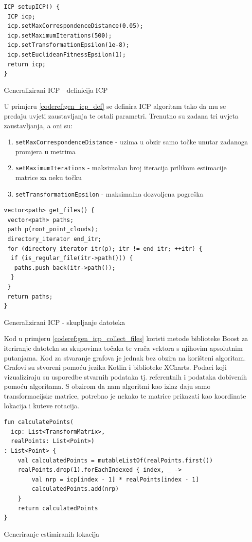 \begin{listing}[h!]
  \begin{verbatim}
ICP setupICP() {
 ICP icp;
 icp.setMaxCorrespondenceDistance(0.05);
 icp.setMaximumIterations(500);
 icp.setTransformationEpsilon(1e-8);
 icp.setEuclideanFitnessEpsilon(1);
 return icp;
}
  \end{verbatim}
  \caption{Generalizirani ICP - definicija ICP}
  \label{coderef:gen_icp_def}
\end{listing}
\pagebreak
U primjeru \ref{coderef:gen_icp_def} se definira ICP algoritam tako da mu se predaju uvjeti zaustavljanja te ostali parametri. Trenutno su zadana tri uvjeta zaustavljanja, a oni su:

\begin{enumerate}
  \item \texttt{setMaxCorrespondenceDistance} - uzima u obzir samo točke unutar zadanoga promjera u metrima
  \item \texttt{setMaximumIterations} - maksimalan broj iteracija prilikom estimacije matrice za neku točku
  \item \texttt{setTransformationEpsilon} - maksimalna dozvoljena pogreška
\end{enumerate}

\begin{listing}[h!]
  \begin{verbatim}
vector<path> get_files() {
 vector<path> paths;
 path p(root_point_clouds);
 directory_iterator end_itr;
 for (directory_iterator itr(p); itr != end_itr; ++itr) {
  if (is_regular_file(itr->path())) {
   paths.push_back(itr->path());
  }
 }
 return paths;
}
  \end{verbatim}
  \caption{Generalizirani ICP - skupljanje datoteka}
  \label{coderef:gen_icp_collect_files}
\end{listing}
\pagebreak
Kod u primjeru \ref{coderef:gen_icp_collect_files} koristi metode biblioteke Boost za iteriranje datoteka sa skupovima točaka te vrača vektora s njihovim apsolutnim putanjama. Kod za stvaranje grafova je jednak bez obzira na korišteni algoritam. Grafovi su stvoreni pomoću jezika Kotlin i biblioteke XCharts. Podaci koji vizualiziraju su usporedbe stvarnih podataka tj. referentnih i podataka dobivenih pomoću algoritama. S obzirom da nam algoritmi kao izlaz daju samo transformacijske matrice, potrebno je nekako te matrice prikazati kao koordinate lokacija i kuteve rotacija.

\begin{listing}[h!]
  \begin{verbatim}
fun calculatePoints(
  icp: List<TransformMatrix>,
  realPoints: List<Point>)
: List<Point> {
    val calculatedPoints = mutableListOf(realPoints.first())
    realPoints.drop(1).forEachIndexed { index, _ ->
        val nrp = icp[index - 1] * realPoints[index - 1]
        calculatedPoints.add(nrp)
    }
    return calculatedPoints
}
  \end{verbatim}
  \caption{Generiranje estimiranih lokacija}
  \label{kotlin:gen_est_loc}
\end{listing}

